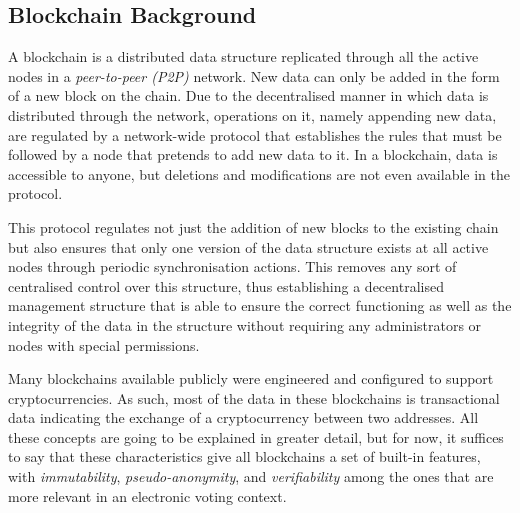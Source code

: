\documentclass[../access.tex]{subfiles}
\begin{document}
    \subsection{Blockchain Background}
        A blockchain is a distributed data structure replicated through all the active nodes in a \textit{peer-to-peer (P2P)} network. New data can only be added in the form of a new block on the chain. Due to the decentralised manner in which data is distributed through the network, operations on it, namely appending new data, are regulated by a network-wide protocol that establishes the rules that must be followed by a node that pretends to add new data to it. In a blockchain, data is accessible to anyone, but deletions and modifications are not even available in the protocol.
        \par
        This protocol regulates not just the addition of new blocks to the existing chain but also ensures that only one version of the data structure exists at all active nodes through periodic synchronisation actions. This removes any sort of centralised control over this structure, thus establishing a decentralised management structure that is able to ensure the correct functioning as well as the integrity of the data in the structure without requiring any administrators or nodes with special permissions.
        \par
        Many blockchains available publicly were engineered and configured to support cryptocurrencies. As such, most of the data in these blockchains is transactional data indicating the exchange of a cryptocurrency between two addresses. All these concepts are going to be explained in greater detail, but for now, it suffices to say that these characteristics give all blockchains a set of built-in features, with \textit{immutability}, \textit{pseudo-anonymity}, and \textit{verifiability} among the ones that are more relevant in an electronic voting context.
    
\end{document}
